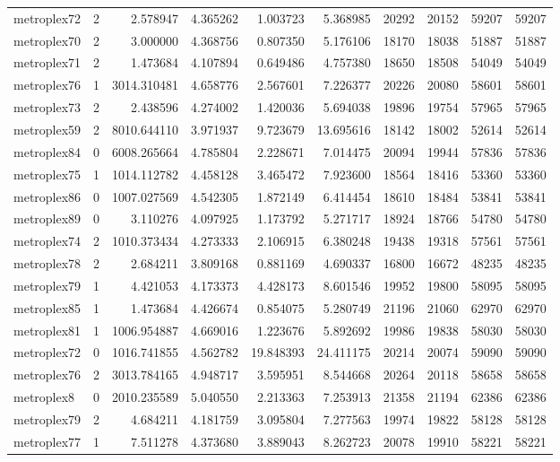 \begin{longtable}{|l|r|r|r|r|r|r|r|r|r|}
metroplex72 & 2 & 2.578947 & 4.365262 & 1.003723 & 5.368985 & 20292 & 20152 & 59207 & 59207 \\
metroplex70 & 2 & 3.000000 & 4.368756 & 0.807350 & 5.176106 & 18170 & 18038 & 51887 & 51887 \\
metroplex71 & 2 & 1.473684 & 4.107894 & 0.649486 & 4.757380 & 18650 & 18508 & 54049 & 54049 \\
metroplex76 & 1 & 3014.310481 & 4.658776 & 2.567601 & 7.226377 & 20226 & 20080 & 58601 & 58601 \\
metroplex73 & 2 & 2.438596 & 4.274002 & 1.420036 & 5.694038 & 19896 & 19754 & 57965 & 57965 \\
metroplex59 & 2 & 8010.644110 & 3.971937 & 9.723679 & 13.695616 & 18142 & 18002 & 52614 & 52614 \\
metroplex84 & 0 & 6008.265664 & 4.785804 & 2.228671 & 7.014475 & 20094 & 19944 & 57836 & 57836 \\
metroplex75 & 1 & 1014.112782 & 4.458128 & 3.465472 & 7.923600 & 18564 & 18416 & 53360 & 53360 \\
metroplex86 & 0 & 1007.027569 & 4.542305 & 1.872149 & 6.414454 & 18610 & 18484 & 53841 & 53841 \\
metroplex89 & 0 & 3.110276 & 4.097925 & 1.173792 & 5.271717 & 18924 & 18766 & 54780 & 54780 \\
metroplex74 & 2 & 1010.373434 & 4.273333 & 2.106915 & 6.380248 & 19438 & 19318 & 57561 & 57561 \\
metroplex78 & 2 & 2.684211 & 3.809168 & 0.881169 & 4.690337 & 16800 & 16672 & 48235 & 48235 \\
metroplex79 & 1 & 4.421053 & 4.173373 & 4.428173 & 8.601546 & 19952 & 19800 & 58095 & 58095 \\
metroplex85 & 1 & 1.473684 & 4.426674 & 0.854075 & 5.280749 & 21196 & 21060 & 62970 & 62970 \\
metroplex81 & 1 & 1006.954887 & 4.669016 & 1.223676 & 5.892692 & 19986 & 19838 & 58030 & 58030 \\
metroplex72 & 0 & 1016.741855 & 4.562782 & 19.848393 & 24.411175 & 20214 & 20074 & 59090 & 59090 \\
metroplex76 & 2 & 3013.784165 & 4.948717 & 3.595951 & 8.544668 & 20264 & 20118 & 58658 & 58658 \\
metroplex8 & 0 & 2010.235589 & 5.040550 & 2.213363 & 7.253913 & 21358 & 21194 & 62386 & 62386 \\
metroplex79 & 2 & 4.684211 & 4.181759 & 3.095804 & 7.277563 & 19974 & 19822 & 58128 & 58128 \\
metroplex77 & 1 & 7.511278 & 4.373680 & 3.889043 & 8.262723 & 20078 & 19910 & 58221 & 58221 \\

\end{longtable}
